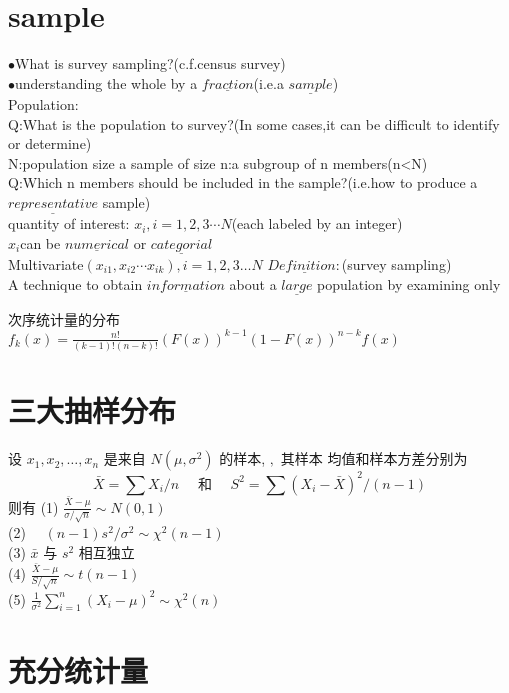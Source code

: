\documentclass[cn,11pt,chinese,black]{elegantbook}
\begin{document}
\section{sample}
\noindent$\bullet$What is survey sampling?(c.f.census survey)\\
$\bullet$understanding the whole by a $\underline{fraction}$(i.e.a $\underline{sample}$)
\\Population:\\
Q:What is the population to survey?(In some cases,it can be difficult to identify or determine)\\
N:population size
a sample of size n:a subgroup of n members(n<N)\\
Q:Which n members should be included in the sample?(i.e.how to produce a $\underline{representative}$ sample)\\
quantity of interest: 
$x_i,i=1,2,3\cdots N$(each labeled by an integer)\\
$x_i$can be $\underline{numerical}$ or $\underline{categorial}$
\\Multivariate$(x_{i1},x_{i2}\cdots x_{ik}),i=1,2,3 \dots N$
$\underline{Definition : }$(survey sampling)\\
A technique to obtain $\underline{information}$ about a $\underline{large}$ population by examining only
\begin{theorem}{次序统计量的分布}
$f_{k}(x)=\frac{n !}{(k-1) !(n-k) !}(F(x))^{k-1}(1-F(x))^{n-k} f(x)$
\end{theorem}
\section{三大抽样分布}
\begin{theorem}
\noindent 设 $x_{1}, x_{2}, \ldots, x_{n}$ 是来自 $N\left(\mu, \sigma^{2}\right)$ 的样本, $,$ 其样本 均值和样本方差分别为
	\[
	\bar{X}=\sum X_{i} / n \quad \text { 和 } \quad S^{2}=\sum\left(X_{i}-\bar{X}\right)^{2} /(n-1)
	\]
	则有
	(1) $\frac{\bar{X}-\mu}{\sigma / \sqrt{n}} \sim N(0,1)$ \\
	(2) $\quad(n-1) s^{2} / \sigma^{2} \sim \chi^{2}(n-1)$\\
		(3) $\bar{x}$ 与 $s^{2}$ 相互独立 \\
	(4) $\frac{\bar{X}-\mu}{S / \sqrt{n}} \sim t(n-1)$\\
	(5) $\frac{1}{\sigma^{2}} \sum_{i=1}^{n}\left(X_{i}-\mu\right)^{2} \sim \chi^{2}(n)$
\end{theorem}
\section{充分统计量}
\end{document}

